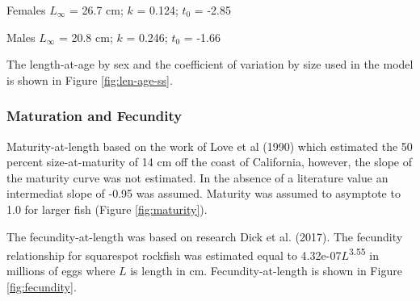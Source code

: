\documentclass[11pt,
  english,
  a4paper,
]{article}
\begin{document}
\leavevmode\tagmcend\tagstructend\par

\begin{centering}

Females $L_{\infty}$ = 26.7 cm; $k$ = 0.124; $t_0$ = -2.85

Males $L_{\infty}$ = 20.8 cm; $k$ = 0.246; $t_0$ = -1.66

\end{centering}

\vspace{0.5cm}


The length-at-age by sex and the coefficient of variation by size used in the model is shown in Figure \ref{fig:len-age-ss}.

\leavevmode\tagmcend\tagstructend\par


\hypertarget{maturation-and-fecundity}{%
\subsubsection{Maturation and Fecundity}\label{maturation-and-fecundity}}

\leavevmode\tagmcend\tagstructend


Maturity-at-length based on the work of Love et al {(1990)\leavevmode\tagmcend\tagstructend} which estimated the 50 percent size-at-maturity of 14 cm off the coast of California, however, the slope of the maturity curve was not estimated. In the absence of a literature value an intermediat slope of -0.95 was assumed. Maturity was assumed to asymptote to 1.0 for larger fish (Figure \ref{fig:maturity}).

\leavevmode\tagmcend\tagstructend\par


The fecundity-at-length was based on research Dick et al. {(2017)\leavevmode\tagmcend\tagstructend}. The fecundity relationship for squarespot rockfish was estimated equal to 4.32e-07{\(L\)\leavevmode\tagmcend\tagstructend}\textsuperscript{3.55} in millions of eggs where {\(L\)\leavevmode\tagmcend\tagstructend} is length in cm. Fecundity-at-length is shown in Figure \ref{fig:fecundity}.
\end{document}
